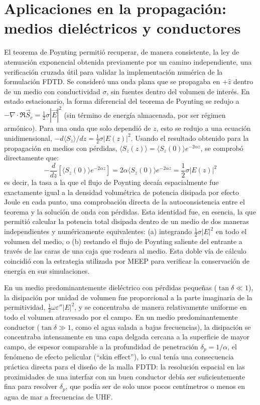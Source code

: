 \section{Aplicaciones en la propagación: medios dieléctricos y conductores}
El teorema de Poynting permitió recuperar, de manera consistente, la ley de atenuación exponencial obtenida previamente por un camino independiente, una verificación cruzada útil para validar la implementación numérica de la formulación FDTD. Se consideró una onda plana que se propagaba en $+\hat{z}$ dentro de un medio con conductividad $\sigma$, sin fuentes dentro del volumen de interés. En estado estacionario, la forma diferencial del teorema de Poynting se redujo a $-\nabla\cdot\Re\vec{S}_c=\frac{1}{2}\sigma|\vec{E}|^2$ (sin término de energía almacenada, por ser régimen armónico). Para una onda que solo dependió de $z$, esto se redujo a una ecuación unidimensional, $-d\langle S_z\rangle/dz = \frac{1}{2}\sigma|E(z)|^2$. Usando el resultado obtenido para la propagación en medios con pérdidas, $\langle S_z(z)\rangle = \langle S_z(0)\rangle e^{-2\alpha z}$, se comprobó directamente que:
\begin{equation}
    -\frac{d}{dz}\left[\langle S_z(0)\rangle e^{-2\alpha z}\right] = 2\alpha\langle S_z(0)\rangle e^{-2\alpha z} = \frac{1}{2}\sigma|E(z)|^2
\end{equation}
es decir, la tasa a la que el flujo de Poynting decaía espacialmente fue exactamente igual a la densidad volumétrica de potencia disipada por efecto Joule en cada punto, una comprobación directa de la autoconsistencia entre el teorema y la solución de onda con pérdidas. Esta identidad fue, en esencia, la que permitió calcular la potencia total disipada dentro de un medio de dos maneras independientes y numéricamente equivalentes: (a) integrando $\frac{1}{2}\sigma|E|^2$ en todo el volumen del medio, o (b) restando el flujo de Poynting saliente del entrante a través de las caras de una caja que rodeara al medio. Esta doble vía de cálculo coincidió con la estrategia utilizada por MEEP para verificar la conservación de energía en sus simulaciones.

En un medio predominantemente dieléctrico con pérdidas pequeñas ($\tan\delta\ll1$), la disipación por unidad de volumen fue proporcional a la parte imaginaria de la permitividad, $\frac{1}{2}\omega\varepsilon''|E|^2$, y se concentraba de manera relativamente uniforme en todo el volumen atravesado por el campo. En un medio predominantemente conductor ($\tan\delta\gg1$, como el agua salada a bajas frecuencias), la disipación se concentraba intensamente en una capa delgada cercana a la superficie de mayor campo, de espesor comparable a la profundidad de penetración $\delta_p=1/\alpha$, el fenómeno de efecto pelicular (``skin effect''), lo cual tenía una consecuencia práctica directa para el diseño de la malla FDTD: la resolución espacial en las proximidades de una interfaz con un buen conductor debía ser suficientemente fina para resolver $\delta_p$, que podía ser de solo unos pocos centímetros o menos en agua de mar a frecuencias de UHF.

